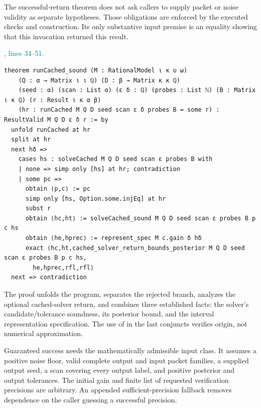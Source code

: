 \documentclass[11pt]{article}\usepackage{needspace}\renewcommand{\paperkind}{Lean companion}\setlength{\parskip}{0.35em}
\begin{document}
The successful-return theorem does not ask callers to supply packet or noise validity as separate hypotheses. Those obligations are enforced by the executed checks and construction. Its only substantive input premise is an equality showing that this invocation returned this result.



{\small\textcolor{teal}{, lines 34--51.}\par}

\begin{lstlisting}[style=BayesSource]
theorem runCached_sound (M : RationalModel ι κ υ ω)
    (Q : α → Matrix ι ι ℚ) (D : β → Matrix κ κ ℚ)
    (seed : α) (scan : List α) (ε δ : ℚ) (probes : List ℕ) (B : Matrix ι κ ℚ) (r : Result ι κ α β)
    (hr : runCached M Q D seed scan ε δ probes B = some r) : ResultValid M Q D ε δ r := by
  unfold runCached at hr
  split at hr
  next hδ =>
    cases hs : solveCached M Q D seed scan ε probes B with
    | none => simp only [hs] at hr; contradiction
    | some pc =>
      obtain ⟨p,c⟩ := pc
      simp only [hs, Option.some.injEq] at hr
      subst r
      obtain ⟨hc,ht⟩ := solveCached_sound M Q D seed scan ε probes B p c hs
      obtain ⟨he,hprec⟩ := represent_spec M c.gain δ hδ
      exact ⟨hc,ht,cached_solver_return_bounds_posterior M Q D seed scan ε probes B p c hs,
        he,hprec,rfl,rfl⟩
  next => contradiction
\end{lstlisting}

The proof unfolds the program, separates the rejected branch, analyzes the optional cached-solver return, and combines three established facts: the solver's candidate/tolerance soundness, its posterior bound, and the interval representation specification. The use of  in the last conjuncts verifies origin, not numerical approximation.

Guaranteed success needs the mathematically admissible input class. It assumes a positive noise floor, valid complete output and input packet families, a supplied output seed, a scan covering every output label, and positive posterior and output tolerances. The initial gain and finite list of requested verification precisions are arbitrary. An appended sufficient-precision fallback removes dependence on the caller guessing a successful precision.
\end{document}
